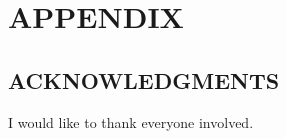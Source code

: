 \chapter{APPENDIX}
\label{ch:appendix}


\section*{ACKNOWLEDGMENTS}
I would like to thank everyone involved.